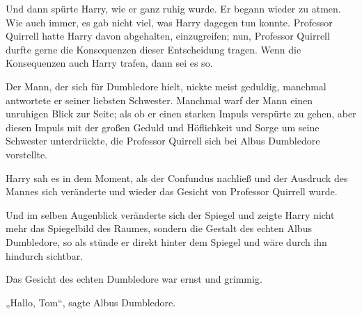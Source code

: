 Und dann spürte Harry, wie er ganz ruhig wurde. Er begann wieder zu atmen.
Wie auch immer, es gab nicht viel, was Harry dagegen tun konnte. Professor Quirrell hatte Harry davon abgehalten, einzugreifen; nun, Professor Quirrell durfte gerne die Konsequenzen dieser Entscheidung tragen. Wenn die Konsequenzen auch Harry trafen, dann sei es so.

Der Mann, der sich für Dumbledore hielt, nickte meist geduldig, manchmal antwortete er seiner liebsten Schwester. Manchmal warf der Mann einen unruhigen Blick zur Seite; als ob er einen starken Impuls verspürte zu gehen, aber diesen Impuls mit der großen Geduld und Höflichkeit und Sorge um seine Schwester unterdrückte, die Professor Quirrell sich bei Albus Dumbledore vorstellte.

Harry sah es in dem Moment, als der Confundus nachließ und der Ausdruck des Mannes sich veränderte und wieder das Gesicht von Professor Quirrell wurde.

Und im selben Augenblick veränderte sich der Spiegel und zeigte Harry nicht mehr das Spiegelbild des Raumes, sondern die Gestalt des echten Albus Dumbledore, so als stünde er direkt hinter dem Spiegel und wäre durch ihn hindurch sichtbar.

Das Gesicht des echten Dumbledore war ernst und grimmig.

„Hallo, Tom“, sagte Albus Dumbledore.

